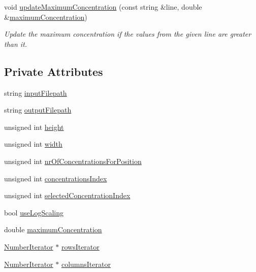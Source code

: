\begin{DoxyCompactItemize}
void \hyperlink{classmultiscale_1_1video_1_1RectangularCsvToInputFilesConverter_ae93b5df92dd2bd02c04fde5b85c3ea75}{update\-Maximum\-Concentration} (const string \&line, double \&\hyperlink{classmultiscale_1_1video_1_1RectangularCsvToInputFilesConverter_aeddcdf92c6f79bf41546fd417d0808b1}{maximum\-Concentration})
\begin{DoxyCompactList}\small\item\em Update the maximum concentration if the values from the given line are greater than it. \end{DoxyCompactList}\end{DoxyCompactItemize}
\subsection*{Private Attributes}
\begin{DoxyCompactItemize}
\item 
string \hyperlink{classmultiscale_1_1video_1_1RectangularCsvToInputFilesConverter_a407e3c2607f036d531445e22454a910e}{input\-Filepath}
\item 
string \hyperlink{classmultiscale_1_1video_1_1RectangularCsvToInputFilesConverter_a2bb6a802fac9b0928bc53a8c71a1c33c}{output\-Filepath}
\item 
unsigned int \hyperlink{classmultiscale_1_1video_1_1RectangularCsvToInputFilesConverter_a766bc7eea1c602f46a4a6c0948464c8a}{height}
\item 
unsigned int \hyperlink{classmultiscale_1_1video_1_1RectangularCsvToInputFilesConverter_a7fe7f3d014535567fbeb465eb01cde1b}{width}
\item 
unsigned int \hyperlink{classmultiscale_1_1video_1_1RectangularCsvToInputFilesConverter_a0bfea1eb0f7dc76deee05af1e2eb744b}{nr\-Of\-Concentrations\-For\-Position}
\item 
unsigned int \hyperlink{classmultiscale_1_1video_1_1RectangularCsvToInputFilesConverter_a48b31e858d0ebac757af77703202634f}{concentrations\-Index}
\item 
unsigned int \hyperlink{classmultiscale_1_1video_1_1RectangularCsvToInputFilesConverter_a5143d25a98a097107c2bed748b4d8df0}{selected\-Concentration\-Index}
\item 
bool \hyperlink{classmultiscale_1_1video_1_1RectangularCsvToInputFilesConverter_a7739ee04a9340d981896861904022f26}{use\-Log\-Scaling}
\item 
double \hyperlink{classmultiscale_1_1video_1_1RectangularCsvToInputFilesConverter_aeddcdf92c6f79bf41546fd417d0808b1}{maximum\-Concentration}
\item 
\hyperlink{classmultiscale_1_1NumberIterator}{Number\-Iterator} $\ast$ \hyperlink{classmultiscale_1_1video_1_1RectangularCsvToInputFilesConverter_a19fa13140bc5d6b163222030b6dfe61e}{rows\-Iterator}
\item 
\hyperlink{classmultiscale_1_1NumberIterator}{Number\-Iterator} $\ast$ \hyperlink{classmultiscale_1_1video_1_1RectangularCsvToInputFilesConverter_aeeee251d65b8c189a72d08f3c70a94be}{columns\-Iterator}
\end{DoxyCompactItemize}
